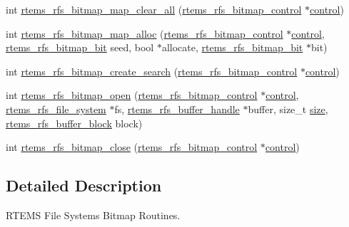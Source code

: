 \begin{DoxyCompactItemize}
\item 
int \mbox{\hyperlink{rtems-rfs-bitmaps_8h_a43897e97e0f7d1c2a7d1defad8d907da}{rtems\+\_\+rfs\+\_\+bitmap\+\_\+map\+\_\+clear\+\_\+all}} (\mbox{\hyperlink{rtems-rfs-bitmaps_8h_aa1b1de5abc294444428eb1038d7f898b}{rtems\+\_\+rfs\+\_\+bitmap\+\_\+control}} $\ast$\mbox{\hyperlink{structcontrol}{control}})
\item 
int \mbox{\hyperlink{rtems-rfs-bitmaps_8h_a9440e240c08c3da4132de47af5b9a21b}{rtems\+\_\+rfs\+\_\+bitmap\+\_\+map\+\_\+alloc}} (\mbox{\hyperlink{rtems-rfs-bitmaps_8h_aa1b1de5abc294444428eb1038d7f898b}{rtems\+\_\+rfs\+\_\+bitmap\+\_\+control}} $\ast$\mbox{\hyperlink{structcontrol}{control}}, \mbox{\hyperlink{rtems-rfs-bitmaps_8h_acc1b0aefe1b090890ccbc1b05279a78e}{rtems\+\_\+rfs\+\_\+bitmap\+\_\+bit}} seed, bool $\ast$allocate, \mbox{\hyperlink{rtems-rfs-bitmaps_8h_acc1b0aefe1b090890ccbc1b05279a78e}{rtems\+\_\+rfs\+\_\+bitmap\+\_\+bit}} $\ast$bit)
\item 
int \mbox{\hyperlink{rtems-rfs-bitmaps_8h_a4023169caad628bff0943dbfde9a23a9}{rtems\+\_\+rfs\+\_\+bitmap\+\_\+create\+\_\+search}} (\mbox{\hyperlink{rtems-rfs-bitmaps_8h_aa1b1de5abc294444428eb1038d7f898b}{rtems\+\_\+rfs\+\_\+bitmap\+\_\+control}} $\ast$\mbox{\hyperlink{structcontrol}{control}})
\item 
int \mbox{\hyperlink{rtems-rfs-bitmaps_8h_a9365e69e28aa6b044fb68f5b56397489}{rtems\+\_\+rfs\+\_\+bitmap\+\_\+open}} (\mbox{\hyperlink{rtems-rfs-bitmaps_8h_aa1b1de5abc294444428eb1038d7f898b}{rtems\+\_\+rfs\+\_\+bitmap\+\_\+control}} $\ast$\mbox{\hyperlink{structcontrol}{control}}, \mbox{\hyperlink{struct__rtems__rfs__file__system}{rtems\+\_\+rfs\+\_\+file\+\_\+system}} $\ast$fs, \mbox{\hyperlink{rtems-rfs-buffer_8h_a17f97c37c5273ad28d413dfd2d175e23}{rtems\+\_\+rfs\+\_\+buffer\+\_\+handle}} $\ast$buffer, size\+\_\+t \mbox{\hyperlink{sun4u_2tte_8h_a245260f6f74972558f61b85227df5aae}{size}}, \mbox{\hyperlink{rtems-rfs-buffer_8h_a5650d53328a5af0a78198fe780aec043}{rtems\+\_\+rfs\+\_\+buffer\+\_\+block}} block)
\item 
int \mbox{\hyperlink{rtems-rfs-bitmaps_8h_a9c5c4b4e9f3e518b9b1d9bed4824c67c}{rtems\+\_\+rfs\+\_\+bitmap\+\_\+close}} (\mbox{\hyperlink{rtems-rfs-bitmaps_8h_aa1b1de5abc294444428eb1038d7f898b}{rtems\+\_\+rfs\+\_\+bitmap\+\_\+control}} $\ast$\mbox{\hyperlink{structcontrol}{control}})
\end{DoxyCompactItemize}


\subsection{Detailed Description}
R\+T\+E\+MS File Systems Bitmap Routines. 


